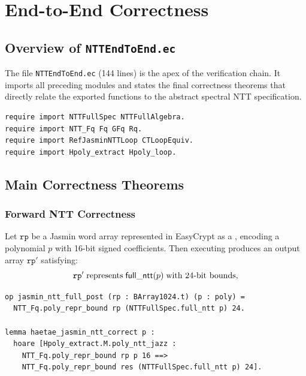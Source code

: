 
\chapter{End-to-End Correctness}
\label{ch:end_to_end}

\section{Overview of \texttt{NTTEndToEnd.ec}}

The file \texttt{NTTEndToEnd.ec} (144 lines) is the apex of the verification
chain.  It imports all preceding modules and states the final correctness
theorems that directly relate the exported \jasmin{} functions to the abstract
spectral NTT specification.

\begin{lstlisting}[language=EasyCrypt,
  caption={Module imports in \texttt{NTTEndToEnd.ec}},
  label={lst:e2e_imports}]
require import NTTFullSpec NTTFullAlgebra.
require import NTT_Fq Fq GFq Rq.
require import RefJasminNTTLoop CTLoopEquiv.
require import Hpoly_extract Hpoly_loop.
\end{lstlisting}

\section{Main Correctness Theorems}

\subsection{Forward NTT Correctness}

\begin{theorem}
  \label{thm:main_ntt}
  Let \(\texttt{rp}\) be a Jasmin word array represented in EasyCrypt as a
  , encoding a polynomial \(p\) with 16-bit signed
  coefficients.  Then executing  produces
  an output array $\texttt{rp}'$ satisfying:
  \[
    \texttt{rp}' \;\text{represents}\; \mathsf{full\_ntt}(p)
    \;\text{with 24-bit bounds},
  \]
\end{theorem}

\begin{lstlisting}[language=EasyCrypt,
  caption={End-to-end NTT correctness statement},
  label={lst:e2e_ntt}]
op jasmin_ntt_full_post (rp : BArray1024.t) (p : poly) =
  NTT_Fq.poly_repr_bound rp (NTTFullSpec.full_ntt p) 24.

lemma haetae_jasmin_ntt_correct p :
  hoare [Hpoly_extract.M.poly_ntt_jazz :
    NTT_Fq.poly_repr_bound rp p 16 ==>
    NTT_Fq.poly_repr_bound res (NTTFullSpec.full_ntt p) 24].
\end{lstlisting}

